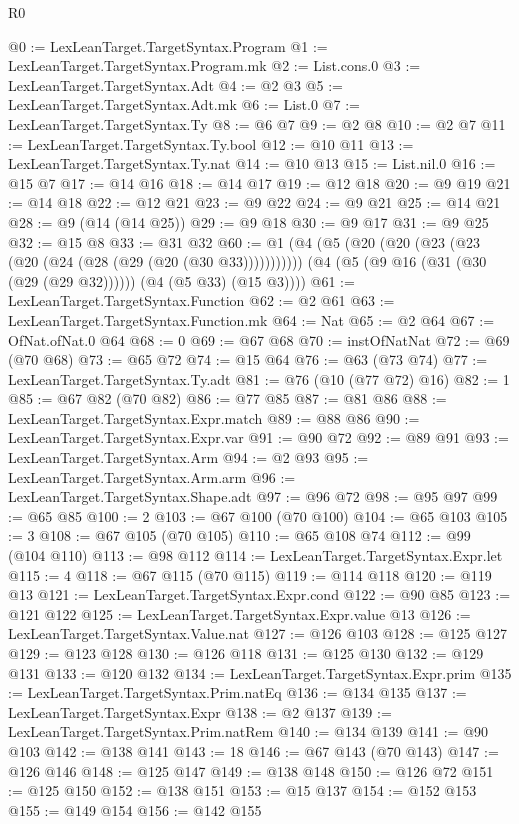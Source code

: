\begin{lexlean}{R0}
\begin{coremodule}
@0 := LexLeanTarget.TargetSyntax.Program
@1 := LexLeanTarget.TargetSyntax.Program.mk
@2 := List.cons.{0}
@3 := LexLeanTarget.TargetSyntax.Adt
@4 := @2 @3
@5 := LexLeanTarget.TargetSyntax.Adt.mk
@6 := List.{0}
@7 := LexLeanTarget.TargetSyntax.Ty
@8 := @6 @7
@9 := @2 @8
@10 := @2 @7
@11 := LexLeanTarget.TargetSyntax.Ty.bool
@12 := @10 @11
@13 := LexLeanTarget.TargetSyntax.Ty.nat
@14 := @10 @13
@15 := List.nil.{0}
@16 := @15 @7
@17 := @14 @16
@18 := @14 @17
@19 := @12 @18
@20 := @9 @19
@21 := @14 @18
@22 := @12 @21
@23 := @9 @22
@24 := @9 @21
@25 := @14 @21
@28 := @9 (@14 (@14 @25))
@29 := @9 @18
@30 := @9 @17
@31 := @9 @25
@32 := @15 @8
@33 := @31 @32
@60 := @1
    (@4
      (@5 (@20 (@20 (@23 (@23 (@20 (@24 (@28 (@29 (@20 (@30 @33)))))))))))
      (@4 (@5 (@9 @16 (@31 (@30 (@29 (@29 @32)))))) (@4 (@5 @33) (@15 @3))))
@61 := LexLeanTarget.TargetSyntax.Function
@62 := @2 @61
@63 := LexLeanTarget.TargetSyntax.Function.mk
@64 := Nat
@65 := @2 @64
@67 := OfNat.ofNat.{0} @64
@68 := 0
@69 := @67 @68
@70 := instOfNatNat
@72 := @69 (@70 @68)
@73 := @65 @72
@74 := @15 @64
@76 := @63 (@73 @74)
@77 := LexLeanTarget.TargetSyntax.Ty.adt
@81 := @76 (@10 (@77 @72) @16)
@82 := 1
@85 := @67 @82 (@70 @82)
@86 := @77 @85
@87 := @81 @86
@88 := LexLeanTarget.TargetSyntax.Expr.match
@89 := @88 @86
@90 := LexLeanTarget.TargetSyntax.Expr.var
@91 := @90 @72
@92 := @89 @91
@93 := LexLeanTarget.TargetSyntax.Arm
@94 := @2 @93
@95 := LexLeanTarget.TargetSyntax.Arm.arm
@96 := LexLeanTarget.TargetSyntax.Shape.adt
@97 := @96 @72
@98 := @95 @97
@99 := @65 @85
@100 := 2
@103 := @67 @100 (@70 @100)
@104 := @65 @103
@105 := 3
@108 := @67 @105 (@70 @105)
@110 := @65 @108 @74
@112 := @99 (@104 @110)
@113 := @98 @112
@114 := LexLeanTarget.TargetSyntax.Expr.let
@115 := 4
@118 := @67 @115 (@70 @115)
@119 := @114 @118
@120 := @119 @13
@121 := LexLeanTarget.TargetSyntax.Expr.cond
@122 := @90 @85
@123 := @121 @122
@125 := LexLeanTarget.TargetSyntax.Expr.value @13
@126 := LexLeanTarget.TargetSyntax.Value.nat
@127 := @126 @103
@128 := @125 @127
@129 := @123 @128
@130 := @126 @118
@131 := @125 @130
@132 := @129 @131
@133 := @120 @132
@134 := LexLeanTarget.TargetSyntax.Expr.prim
@135 := LexLeanTarget.TargetSyntax.Prim.natEq
@136 := @134 @135
@137 := LexLeanTarget.TargetSyntax.Expr
@138 := @2 @137
@139 := LexLeanTarget.TargetSyntax.Prim.natRem
@140 := @134 @139
@141 := @90 @103
@142 := @138 @141
@143 := 18
@146 := @67 @143 (@70 @143)
@147 := @126 @146
@148 := @125 @147
@149 := @138 @148
@150 := @126 @72
@151 := @125 @150
@152 := @138 @151
@153 := @15 @137
@154 := @152 @153
@155 := @149 @154
@156 := @142 @155

\end{coremodule}
\end{lexlean}
